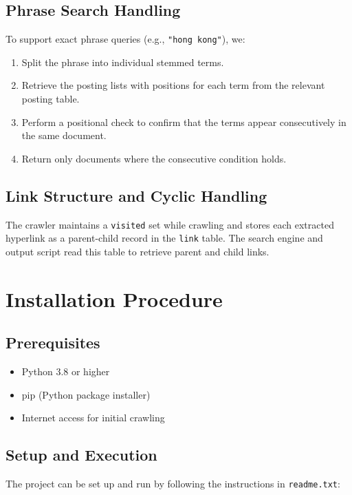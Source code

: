 \documentclass[11pt,a4paper]{article}
\begin{document}
\subsection{Phrase Search Handling}
To support exact phrase queries (e.g., \texttt{"hong kong"}), we:
\begin{enumerate}
    \item Split the phrase into individual stemmed terms.
    \item Retrieve the posting lists with positions for each term from the relevant posting table.
    \item Perform a positional check to confirm that the terms appear consecutively in the same document.
    \item Return only documents where the consecutive condition holds.
\end{enumerate}

\subsection{Link Structure and Cyclic Handling}
The crawler maintains a \texttt{visited} set while crawling and stores each extracted hyperlink as a parent-child record in the \texttt{link} table. The search engine and output script read this table to retrieve parent and child links.

\section{Installation Procedure}

\subsection{Prerequisites}
\begin{itemize}
    \item Python 3.8 or higher
    \item pip (Python package installer)
    \item Internet access for initial crawling
\end{itemize}

\subsection{Setup and Execution}
The project can be set up and run by following the instructions in \texttt{readme.txt}:
\end{document}
